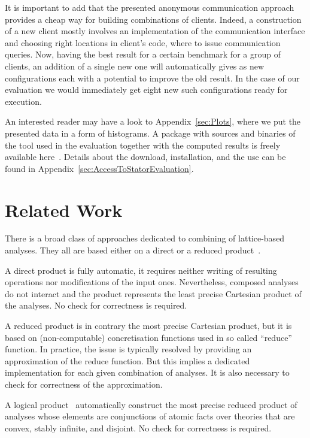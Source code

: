 \documentclass[envcountsame]{llncs}
\begin{document}
\vspace{2mm}
It is important to add that the presented anonymous communication approach
provides a cheap way for building combinations of clients. Indeed, a
construction of a new client mostly involves an implementation of the
communication interface and choosing right locations in client's code, where to
issue communication queries. Now, having the best result for a certain benchmark
for a group of  clients, an addition of a single new one will automatically
gives as  new configurations
each with a potential to improve the old result. In the case of our evaluation
we would immediately get eight new such configurations ready for execution.

An interested reader may have a look to Appendix~\ref{sec:Plots}, where we put
the presented data in a form of histograms. A package with sources and binaries
of the tool used in the evaluation together with the computed results is
freely available here~\cite{StatorURL}. Details about the
download, installation, and the use can be found in
Appendix~\ref{sec:AccessToStatorEvaluation}.


\section{Related Work}
\label{sec:RelatedWork}



There is a broad class of approaches dedicated to combining of lattice-based
analyses. They all are based either on a direct or a reduced
product~\cite{DirectReducedProduct}.

A direct product is fully automatic, it requires neither writing of resulting
operations nor modifications of the input ones. Nevertheless, composed analyses
do not interact and the product represents the least precise Cartesian product
of the analyses. No check for correctness is required.

A reduced product is in contrary the most precise Cartesian product, but it is
based on (non-computable) concretisation functions used in so called ``reduce''
function. In practice, the issue is typically resolved by providing an
approximation of the reduce function. But this implies a dedicated
implementation for each given combination of analyses. It is also necessary to
check for correctness of the approximation.

A logical product~\cite{LogicalProduct} automatically construct the most precise
reduced product of analyses whose elements are conjunctions of atomic facts over
theories that are convex, stably infinite, and disjoint. No check for
correctness is required. 
\end{document}
